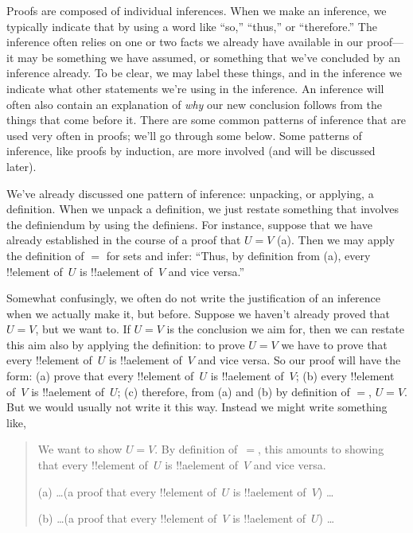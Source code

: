 \documentclass[../../../include/open-logic-section]{subfiles}
\begin{document}


Proofs are composed of individual inferences. When we make an
inference, we typically indicate that by using a word like ``so,''
``thus,'' or ``therefore.''  The inference often relies on one or two
facts we already have available in our proof---it may be something we
have assumed, or something that we've concluded by an inference
already.  To be clear, we may label these things, and in the inference
we indicate what other statements we're using in the inference.  An
inference will often also contain an explanation of \emph{why} our new
conclusion follows from the things that come before it.  There are
some common patterns of inference that are used very often in proofs;
we'll go through some below. Some patterns of inference, like proofs
by induction, are more involved (and will be discussed later).

We've already discussed one pattern of inference: unpacking, or
applying, a definition. When we unpack a definition, we just restate
something that involves the definiendum by using the definiens. For
instance, suppose that we have already established in the course of a
proof that $U = V$ (a). Then we may apply the definition of $=$ for sets
and infer: ``Thus, by definition from (a), every !!{element}
of~$U$ is !!a{element} of~$V$ and vice versa.''

Somewhat confusingly, we often do not write the justification of an
inference when we actually make it, but before.  Suppose we haven't
already proved that $U = V$, but we want to.  If $U = V$ is the
conclusion we aim for, then we can restate this aim also by applying
the definition: to prove $U = V$ we have to prove that every
!!{element} of~$U$ is !!a{element} of~$V$ and vice versa.  So our
proof will have the form: (a) prove that every !!{element} of~$U$ is
!!a{element} of~$V$; (b) every !!{element} of~$V$ is !!a{element}
of~$U$; (c) therefore, from (a) and (b) by definition of $=$, $U = V$.
But we would usually not write it this way. Instead we might write
something like,
\begin{quote}
We want to show $U = V$. By definition of~$=$, this amounts to showing
that every !!{element} of~$U$ is !!a{element} of~$V$ and vice
versa.

(a) \dots (a proof that every !!{element} of~$U$ is !!a{element}
of~$V$) \dots

(b) \dots (a proof that every !!{element}
of~$V$ is !!a{element} of~$U$) \dots
\end{quote}
\end{document}
